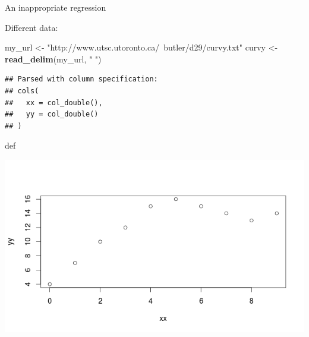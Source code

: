 \documentclass[ignorenonframetext,]{beamer}
\newenvironment{Shaded}{\begin{snugshade}}{\end{snugshade}}
\newcommand{\KeywordTok}[1]{\textcolor[rgb]{0.13,0.29,0.53}{\textbf{#1}}}
\newcommand{\NormalTok}[1]{#1}
\newcommand{\StringTok}[1]{\textcolor[rgb]{0.31,0.60,0.02}{#1}}
\begin{document}
\begin{frame}[fragile]{An inappropriate regression}
\protect\hypertarget{an-inappropriate-regression}{}

Different data:

\begin{Shaded}
\begin{Highlighting}[]
\NormalTok{my_url <-}\StringTok{ "http://www.utsc.utoronto.ca/~butler/d29/curvy.txt"}
\NormalTok{curvy <-}\StringTok{ }\KeywordTok{read_delim}\NormalTok{(my_url, }\StringTok{" "}\NormalTok{)}
\end{Highlighting}
\end{Shaded}

\begin{verbatim}
## Parsed with column specification:
## cols(
##   xx = col_double(),
##   yy = col_double()
## )
\end{verbatim}

def

\includegraphics{curvy-scatter.png}

\end{frame}
\end{document}
